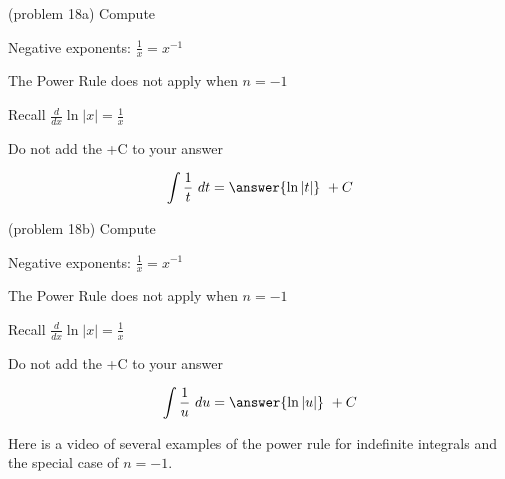 \documentclass[handout]{ximera}
\begin{document}
\begin{problem}(problem 18a)
Compute 

\begin{hint}
Negative exponents: $\frac{1}{x} = x^{-1}$
\end{hint}
\begin{hint}
The Power Rule does not apply when $n = -1$
\end{hint}
\begin{hint}
Recall $\frac{d}{dx} \ln|x| = \frac{1}{x}$
\end{hint}
\begin{hint}
\begin{center}
Do not add the +C to your answer
\end{center}
\end{hint}

\[
\int \frac{1}{t} \ dt =
\answer{\ln|t|} \ + C
\]
\end{problem}

\begin{problem}(problem 18b)
Compute 

\begin{hint}
Negative exponents: $\frac{1}{x} = x^{-1}$
\end{hint}
\begin{hint}
The Power Rule does not apply when $n = -1$
\end{hint}
\begin{hint}
Recall $\frac{d}{dx} \ln|x| = \frac{1}{x}$
\end{hint}
\begin{hint}
\begin{center}
Do not add the +C to your answer
\end{center}
\end{hint}

\[
\int \frac{1}{u} \ du =
\answer{\ln|u|} \ + C
\]
\end{problem}

Here is a video of several examples of the power rule for indefinite integrals and the special case of $n=-1$.
\begin{foldable}
\end{foldable}
\end{document}
